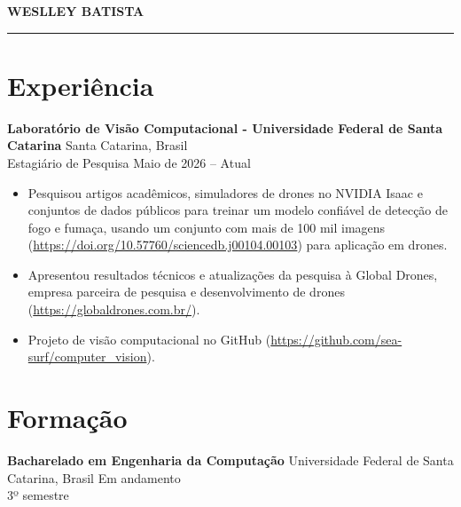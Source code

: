 \documentclass[a4paper,10pt]{article}
\begin{document}
\pagestyle{empty} %

\begin{center}
    {\huge \textbf{WESLLEY BATISTA}} \\
    \vspace{4pt}
    \hrule
    \vspace{6pt}
    {\small
    }
\end{center}

\section*{Experiência}
\noindent
\textbf{Laboratório de Visão Computacional - Universidade Federal de Santa Catarina} \hfill Santa Catarina, Brasil \\
Estagiário de Pesquisa \hfill Maio de 2026 -- Atual
\begin{itemize}[leftmargin=*, noitemsep, topsep=0pt]
    \item Pesquisou artigos acadêmicos, simuladores de drones no NVIDIA Isaac e conjuntos de dados públicos para treinar um modelo confiável de detecção de fogo e fumaça, usando um conjunto com mais de 100 mil imagens (\url{https://doi.org/10.57760/sciencedb.j00104.00103}) para aplicação em drones.
    \item Apresentou resultados técnicos e atualizações da pesquisa à Global Drones, empresa parceira de pesquisa e desenvolvimento de drones (\url{https://globaldrones.com.br/}).
    \item Projeto de visão computacional no GitHub (\url{https://github.com/sea-surf/computer_vision}).
\end{itemize}


\section*{Formação}
\noindent
\textbf{Bacharelado em Engenharia da Computação} \hfill Universidade Federal de Santa Catarina, Brasil \hfill Em andamento\\ \hfill 3º semestre
\end{document}
